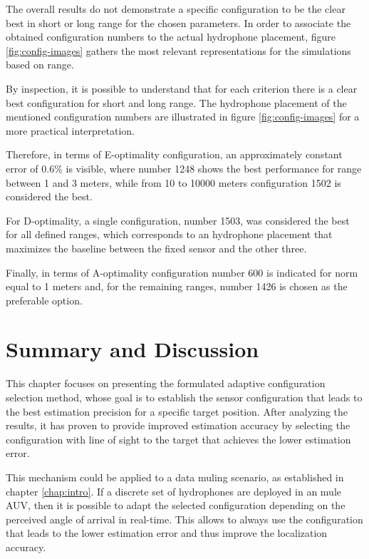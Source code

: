 The overall results do not demonstrate a specific configuration to be the clear best in short or long range for the chosen parameters. In order to associate the obtained configuration numbers to the actual hydrophone placement, figure \ref{fig:config-images} gathers the most relevant representations for the simulations based on range. 

By inspection, it is possible to understand that for each criterion there is a clear best configuration for short and long range. The hydrophone placement of the mentioned configuration numbers are illustrated in figure \ref{fig:config-images} for a more practical interpretation. 

Therefore, in terms of E-optimality configuration, an approximately constant error of 0.6\% is visible, where number 1248 shows the best performance for range between 1 and 3 meters, while from 10 to 10000 meters configuration 1502 is considered the best.

For D-optimality, a single configuration, number 1503, was considered the best for all defined ranges, which corresponds to an hydrophone placement that maximizes the baseline between the fixed sensor and the other three.

Finally, in terms of A-optimality configuration number 600 is indicated for norm equal to 1 meters and, for the remaining ranges, number 1426 is chosen as the preferable option.

\section{Summary and Discussion}

This chapter focuses on presenting the formulated adaptive configuration selection method, whose goal is to establish the sensor configuration that leads to the best estimation precision for a specific target position. After analyzing the results, it has proven to provide improved estimation accuracy by selecting the configuration with line of sight to the target that achieves the lower estimation error. 

This mechanism could be applied to a data muling scenario, as established in chapter \ref{chap:intro}. If a discrete set of hydrophones are deployed in an mule AUV, then it is possible to adapt the selected configuration depending on the perceived angle of arrival in real-time. This allows to always use the configuration that leads to the lower estimation error and thus improve the localization accuracy.

